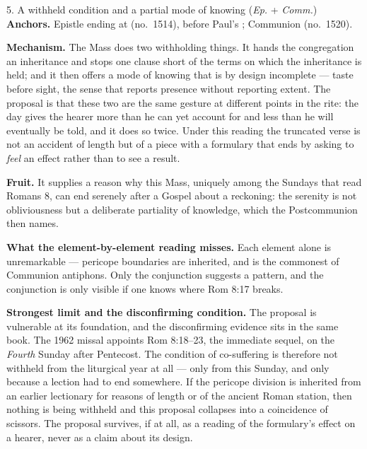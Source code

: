 \begin{proposal}{5. A withheld condition and a partial mode of knowing
\normalfont(\emph{Ep.} + \emph{Comm.})}
\textbf{Anchors.} Epistle ending at  (no.\ 1514),
before Paul's ; Communion
 (no.\ 1520).

\textbf{Mechanism.} The Mass does two withholding things. It hands the
congregation an inheritance and stops one clause short of the terms on which the
inheritance is held; and it then offers a mode of knowing that is by design
incomplete --- taste before sight, the sense that reports presence without
reporting extent. The proposal is that these two are the same gesture at
different points in the rite: the day gives the hearer more than he can yet
account for and less than he will eventually be told, and it does so twice.
Under this reading the truncated verse is not an accident of length but of a
piece with a formulary that ends by asking to \emph{feel} an effect rather than
to see a result.

\textbf{Fruit.} It supplies a reason why this Mass, uniquely among the Sundays
that read Romans 8, can end serenely after a Gospel about a reckoning: the
serenity is not obliviousness but a deliberate partiality of knowledge, which
the Postcommunion then names.

\textbf{What the element-by-element reading misses.} Each element alone is
unremarkable --- pericope boundaries are inherited, and  is the commonest of Communion antiphons. Only the conjunction suggests a
pattern, and the conjunction is only visible if one knows where Rom 8:17 breaks.

\textbf{Strongest limit and the disconfirming condition.} The proposal is
vulnerable at its foundation, and the disconfirming evidence sits in the same
book. The 1962 missal appoints Rom 8:18--23, the immediate sequel, on the
\emph{Fourth} Sunday after Pentecost. The condition of co-suffering is therefore
not withheld from the liturgical year at all --- only from this Sunday, and only
because a lection had to end somewhere. If the pericope division is inherited
from an earlier lectionary for reasons of length or of the ancient Roman
station, then nothing is being withheld and this proposal collapses into a
coincidence of scissors. The proposal survives, if at all, as a reading of the
formulary's effect on a hearer, never as a claim about its design.
\end{proposal}

\clearpage

